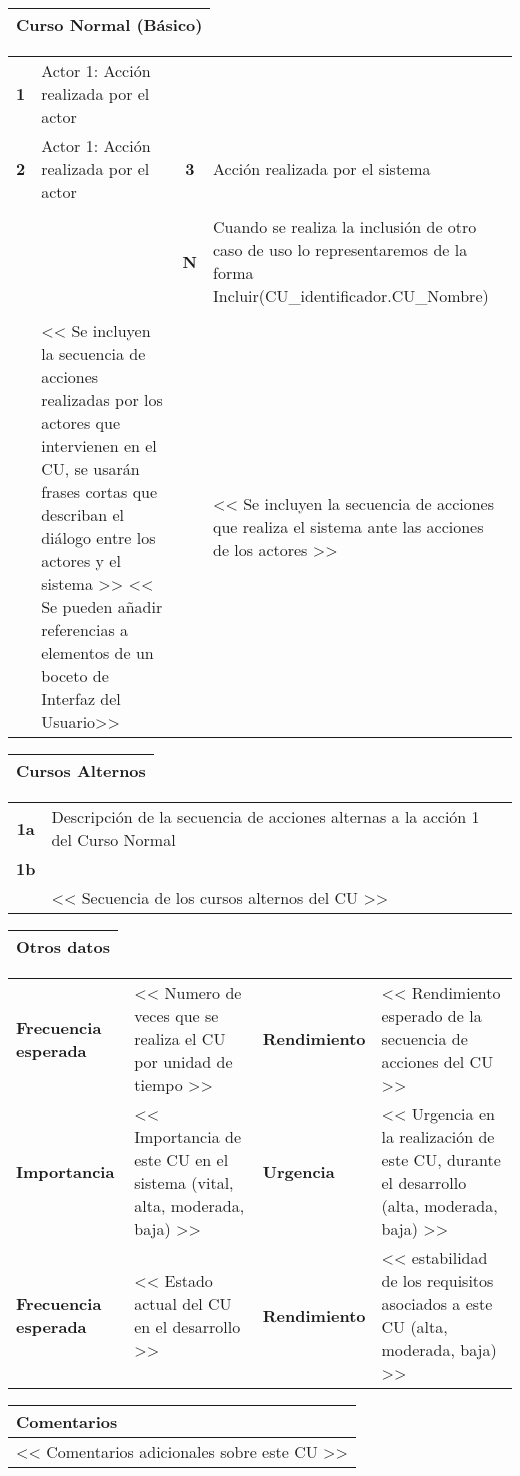 \documentclass[11pt,a4paper]{article}
\begin{document}
\begin{table}[H]
	\begin{tabularx}{\textwidth}{X}
		\textbf{Curso Normal (Básico)}\\ \hline
	\end{tabularx}
	\begin{tabularx}{\textwidth}{cXcX}
		\textbf{1} & Actor 1: Acción realizada por el actor & & \\
		\textbf{2} & Actor 1: Acción realizada por el actor & \textbf{3} & Acción realizada por el sistema \\
		 & & & \\
		 & & \textbf{N} &  Cuando se realiza la inclusión de otro caso de uso lo representaremos de la forma Incluir(CU\_identificador.CU\_Nombre)\\
		 & & & \\
		 & << Se incluyen la secuencia de acciones realizadas por los actores que intervienen en el CU, se usarán frases cortas que describan el diálogo entre los actores y el sistema >> << Se pueden añadir referencias a elementos de un boceto de Interfaz del Usuario>> & & << Se incluyen la secuencia de acciones que realiza el sistema ante las acciones de los actores >>
	\end{tabularx}
\end{table}

\begin{table}[H]
	\begin{tabularx}{\textwidth}{X}
		\textbf{Cursos Alternos}\\ \hline
	\end{tabularx}
	\begin{tabularx}{\textwidth}{cX}
		\textbf{1a} & Descripción de la secuencia de acciones alternas a la acción 1 del Curso Normal\\
		\textbf{1b} & \\
		 & << Secuencia de los cursos alternos del CU >>
	\end{tabularx}
	\begin{tabularx}{\textwidth}{X}
		\textbf{Otros datos}\\ \hline
	\end{tabularx}
	\begin{tabularx}{\textwidth}{lXlX}
		\textbf{Frecuencia esperada} & << Numero de veces que se realiza el CU por unidad de tiempo >> & \textbf{Rendimiento} & << Rendimiento esperado de la secuencia de acciones del CU >>\\
		\textbf{Importancia} & << Importancia de este CU en el sistema (vital, alta, moderada, baja) >> & \textbf{Urgencia} & << Urgencia en la realización de este CU, durante el desarrollo (alta, moderada, baja) >>\\
		\textbf{Frecuencia esperada} & << Estado actual del CU en el desarrollo >> & \textbf{Rendimiento} & << estabilidad de los requisitos asociados a este CU (alta, moderada, baja) >>\\
	\end{tabularx}
	\begin{tabularx}{\textwidth}{X}
		\textbf{Comentarios}\\ \hline
		<< Comentarios adicionales sobre este CU >>
	\end{tabularx}
\end{table}
\end{document}
